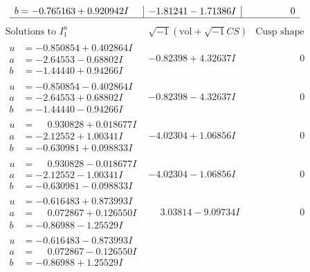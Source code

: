 \documentclass[1p]{elsarticle_modified}
\theoremstyle{definition}
\newcommand{\I}{\sqrt{-1}}
\begin{document}
$$\begin{array}{c|c|c}
\begin{aligned}
b &= -0.765163 + 0.920942 I\end{aligned}
 & -1.81241 - 1.71386 I & \phantom{-0.000000 } 0\\
 \hline 
 \end{array}$$\newpage$$\begin{array}{c|c|c}  
\text{Solutions to }I^u_{1}& \I (\text{vol} + \sqrt{-1}CS) & \text{Cusp shape}\\
 \hline 
\begin{aligned}
u &= -0.850854 + 0.402864 I \\
a &= -2.64553 - 0.68802 I \\
b &= -1.44440 + 0.94266 I\end{aligned}
 & -0.82398 + 4.32637 I & \phantom{-0.000000 } 0 \\ \hline\begin{aligned}
u &= -0.850854 - 0.402864 I \\
a &= -2.64553 + 0.68802 I \\
b &= -1.44440 - 0.94266 I\end{aligned}
 & -0.82398 - 4.32637 I & \phantom{-0.000000 } 0 \\ \hline\begin{aligned}
u &= \phantom{-}0.930828 + 0.018677 I \\
a &= -2.12552 + 1.00341 I \\
b &= -0.630981 + 0.098833 I\end{aligned}
 & -4.02304 + 1.06856 I & \phantom{-0.000000 } 0 \\ \hline\begin{aligned}
u &= \phantom{-}0.930828 - 0.018677 I \\
a &= -2.12552 - 1.00341 I \\
b &= -0.630981 - 0.098833 I\end{aligned}
 & -4.02304 - 1.06856 I & \phantom{-0.000000 } 0 \\ \hline\begin{aligned}
u &= -0.616483 + 0.873993 I \\
a &= \phantom{-}0.072867 + 0.126550 I \\
b &= -0.86988 - 1.25529 I\end{aligned}
 & \phantom{-}3.03814 - 9.09734 I & \phantom{-0.000000 } 0 \\ \hline\begin{aligned}
u &= -0.616483 - 0.873993 I \\
a &= \phantom{-}0.072867 - 0.126550 I \\
b &= -0.86988 + 1.25529 I\end{aligned}

\end{array}$$
\end{document}
